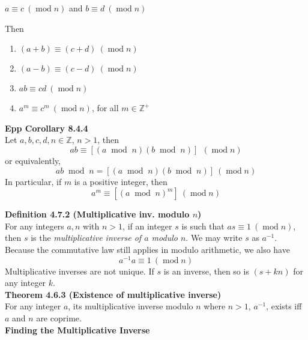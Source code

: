 \documentclass[a4paper]{article}
\newcommand{\subheading}[1]{{\scriptsize\textbf{#1}}}
\renewcommand\mod{\;\operatorname{mod}\;}  %
\newcommand\undermod[1]{\ (\operatorname{mod}#1)}
\begin{document}
\begin{multicols*}{4}
{\centering
  $a \equiv c \undermod{n}$ and $b \equiv d \undermod{n}$\\
}

Then

\begin{enumerate} \itemsep -0.5em
  \item $(a + b) \equiv (c + d) \undermod{n}$
  \item $(a - b) \equiv (c - d) \undermod{n}$
  \item $ab \equiv cd \undermod{n}$
  \item $a^m \equiv c^m \undermod{n}$, for all $m \in \mathbb{Z}^+$
\end{enumerate}

\subheading{Epp Corollary 8.4.4}\\
Let $a, b, c, d, n \in \mathbb{Z}$, $n > 1$, then
$$ ab \equiv [(a \mod n)(b \mod n)]\ \undermod{n} $$
or equivalently,
$$ ab \mod n = [(a \mod n)(b \mod n)] \undermod{n} $$
In particular, if $m$ is a positive integer, then
$$ a^m \equiv [(a \mod n)^m] \undermod{n} $$

\subheading{Definition 4.7.2 (Multiplicative inv. modulo $n$)}\\
For any integers $a, n$ with $n > 1$, if an integer $s$ is such that $as \equiv
1 \undermod{n}$, then $s$ is the \textit{multiplicative inverse of $a$
modulo $n$}. We may write $s$ as $a^{-1}$.\\

Because the commutative law still applies in modulo arithmetic, we also have
$$a^{-1}a \equiv 1 \undermod{n}$$
Multiplicative inverses are not unique. If $s$ is an inverse, then so is $(s +
kn)$ for any integer $k$.\\

\subheading{Theorem 4.6.3 (Existence of multiplicative inverse)}\\
For any integer $a$, its multiplicative inverse modulo $n$ where $n>1$,
$a^{-1}$, exists iff $a$ and $n$ are coprime.\\

\subheading{Finding the Multiplicative Inverse}


\end{multicols*}
\end{document}
